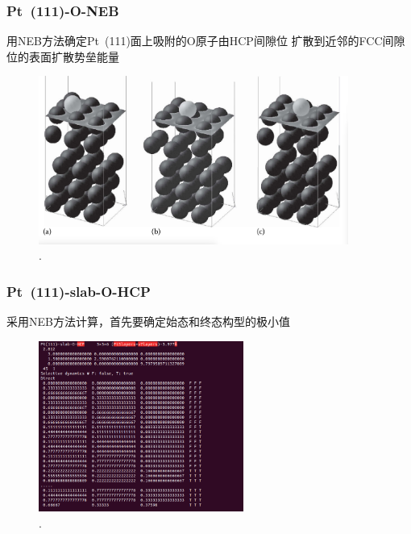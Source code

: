 {
	\frametitle{\textrm{Pt~(111)-O-NEB}}
	用\textrm{NEB}方法确定\textrm{Pt~(111)}面上吸附的\textrm{O}原子由\textrm{HCP}间隙位%
	扩散到近邻的\textrm{FCC}间隙位的表面扩散势垒能量%
\begin{figure}[h!]
\centering
\includegraphics[width=4.0in,viewport=0 10 1040 530,clip]{Figures/Pt_NEB-config.png}
\caption{\fontsize{6.2pt}{5.2pt}.}%
\label{Pt_NEB-config}
\end{figure} 
}

\frame
{
	\frametitle{\textrm{Pt~(111)-slab-O-HCP}}
采用\textrm{NEB}方法计算，首先要确定始态和终态构型的极小值%
\begin{figure}[h!]
	\vskip -5pt
\centering
\includegraphics[height=2.2in,viewport=0 5 470 500,clip]{Figures/Pt_NEB-init-POSCAR.png}
\caption{\fontsize{6.2pt}{5.2pt}.}%
\label{Pt_NEB-init-POSCAR}
\end{figure}
{\fontsize{7.2pt}{5.2pt}}
}


